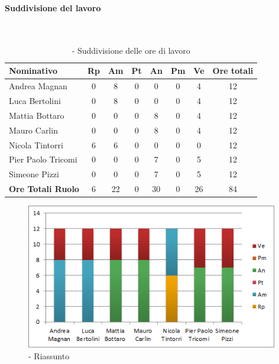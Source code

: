 \documentclass[./PianoDiProgetto.tex]{subfiles}
\begin{document}
\vspace{20 mm}
	
	\subsubsection{\PerAD}
				\paragraph{Suddivisione del lavoro}\
				
	\begin{table}[H]
		\begin{tabularx}{\textwidth}{l  * {6}{c}  c}
			\toprule
			\textbf{Nominativo} & \textbf{Rp} & \textbf{Am} & \textbf{Pt} 
						& \textbf{An} & \textbf{Pm} & \textbf{Ve} & \textbf{Ore totali} \\
			\midrule
			Andrea Magnan & 0 & 8 &	0 &	0 & 0 & 4 & 12 \\
			Luca Bertolini & 0 & 8 & 0 & 0 & 0 & 4 & 12 \\
			Mattia Bottaro & 0 & 0 & 0 & 8 & 0 & 4 & 12 \\
			Mauro Carlin & 0 & 0 &	0 &	8 & 0 & 4 & 12 \\
			Nicola Tintorri &	6 & 6 & 0 & 0 & 0 & 0 & 12 \\
			Pier Paolo Tricomi & 0 & 0 &	0 &	7 & 0 & 5 & 12 \\
			Simeone Pizzi & 0 & 0 & 0 & 7 & 0 & 5 & 12 \\
			\midrule			
			\textbf{Ore Totali Ruolo} & 6 & 22 & 0 & 30 & 0 & 26 & 84 \\
			\bottomrule
		\end{tabularx}	
		\caption{\PerAD{} - Suddivisione delle ore di lavoro}
	\end{table}
\newpage

	\vspace{15 mm}	
	
	
	\begin{figure}[H]
		\centering
		\includegraphics[width=11cm, trim=1cm 0cm 1cm 0cm]{grafici/AD-persona}
			\caption{\PerAD{} - Riassunto}
	\end{figure}
	
\end{document}
